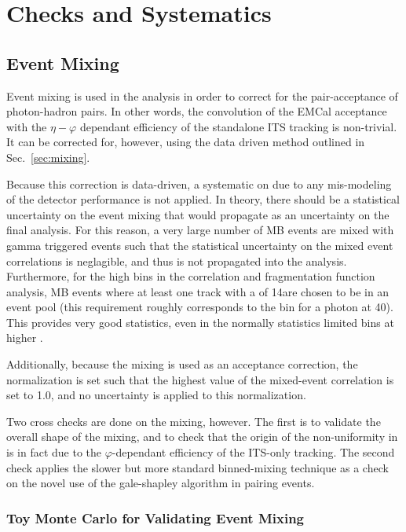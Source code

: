 \chapter{Checks and Systematics}

\section{Event Mixing}
Event mixing is used in the analysis in order to correct for the pair-acceptance of photon-hadron pairs. In other words, the convolution of the EMCal acceptance with the $\eta-\varphi$ dependant efficiency of the standalone ITS tracking is non-trivial. It can be corrected for, however, using the data driven method outlined in Sec.~\ref{sec:mixing}.

Because this correction is data-driven, a systematic on due to any mis-modeling of the detector performance is not applied. In theory, there should be a statistical uncertainty on the event mixing that would propagate as an uncertainty on the final analysis. For this reason, a very large number of MB events are mixed with gamma triggered events such that the statistical uncertainty on the mixed event correlations is neglagible, and thus is not propagated into the analysis. Furthermore, for the high \zt bins in the correlation and fragmentation function analysis, MB events where at least one track with a \pt of 14\GeVc are chosen to be in an event pool (this \pt requirement roughly corresponds to the \zt bin for a photon at 40\GeVc). This provides very good statistics, even in the normally statistics limited bins at higher \zt.

Additionally, because the mixing is used as an acceptance correction, the normalization is set such that the highest value of the mixed-event correlation is set to 1.0, and no uncertainty is applied to this normalization.

Two cross checks are done on the mixing, however. The first is to validate the overall shape of the mixing, and to check that the origin of the non-uniformity in \deltaphi is in fact due to the $\varphi$-dependant efficiency of the ITS-only tracking. The second check applies the slower but more standard binned-mixing technique as a check on the novel use of the gale-shapley algorithm in pairing events.

\subsection{Toy Monte Carlo for Validating Event Mixing}
\label{sec:ToyMC_Mixing}

